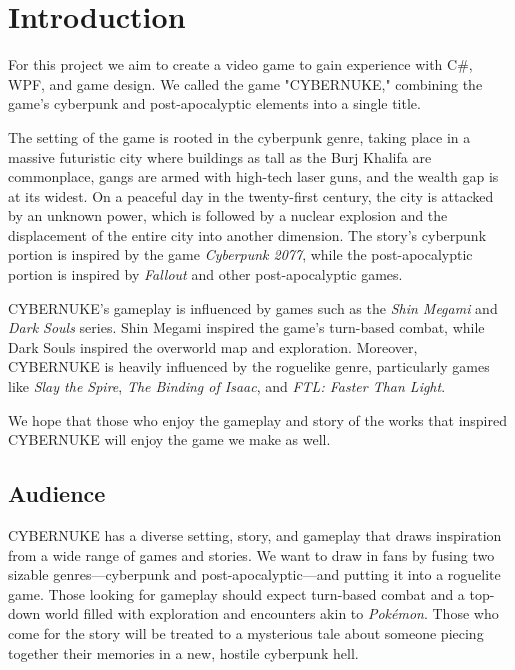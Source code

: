 \documentclass[10pt,conference,onecolumn,compsoc]{IEEEtran}
\begin{document}
\IEEEdisplaynontitleabstractindextext
\IEEEpeerreviewmaketitle



\section{Introduction}

For this project we aim to create a video game to gain experience with C\#, WPF, and game design. We called the game "CYBERNUKE," combining the game's cyberpunk and post-apocalyptic elements into a single title. 

The setting of the game is rooted in the cyberpunk genre, taking place in a massive futuristic city where buildings as tall as the Burj Khalifa are commonplace, gangs are armed with high-tech laser guns, and the wealth gap is at its widest. On a peaceful day in the twenty-first century, the city is attacked by an unknown power, which is followed by a nuclear explosion and the displacement of the entire city into another dimension. The story's cyberpunk portion is inspired by the game \emph{Cyberpunk 2077}, while the post-apocalyptic portion is inspired by \emph{Fallout} and other post-apocalyptic games. 

CYBERNUKE's gameplay is influenced by games such as the \emph{Shin Megami} and \emph{Dark Souls} series. Shin Megami inspired the game's turn-based combat, while Dark Souls inspired the overworld map and exploration. Moreover, CYBERNUKE is heavily influenced by the roguelike genre, particularly games like \emph{Slay the Spire}, \emph{The Binding of Isaac}, and \emph{FTL: Faster Than Light}.

We hope that those who enjoy the gameplay and story of the works that inspired CYBERNUKE will enjoy the game we make as well.

\subsection{Audience}
CYBERNUKE has a diverse setting, story, and gameplay that draws inspiration from a wide range of games and stories. We want to draw in fans by fusing two sizable genres—cyberpunk and post-apocalyptic—and putting it into a roguelite game. Those looking for gameplay should expect turn-based combat and a top-down world filled with exploration and encounters akin to \emph{Pokémon}. Those who come for the story will be treated to a mysterious tale about someone piecing together their memories in a new, hostile cyberpunk hell. 
\end{document}
